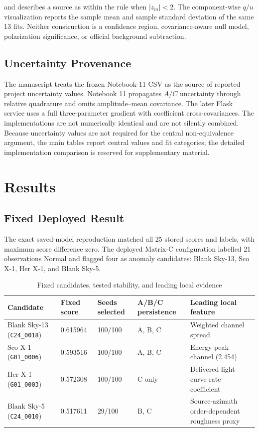 \documentclass[conference]{IEEEtran}
\begin{document}
and describes a source as within the rule when $|z_m|<2$. The component-wise $q/u$ visualization reports the sample mean and sample standard deviation of the same 13 fits. Neither construction is a confidence region, covariance-aware null model, polarization significance, or official background subtraction.


\subsection{Uncertainty Provenance}

The manuscript treats the frozen Notebook-11 CSV as the source of reported project uncertainty values. Notebook 11 propagates $A/C$ uncertainty through relative quadrature and omits amplitude--mean covariance. The later Flask service uses a full three-parameter gradient with coefficient cross-covariances. The implementations are not numerically identical and are not silently combined. Because uncertainty values are not required for the central non-equivalence argument, the main tables report central values and fit categories; the detailed implementation comparison is reserved for supplementary material.


\section{Results}

\subsection{Fixed Deployed Result}

The exact saved-model reproduction matched all 25 stored scores and labels, with maximum score difference zero. The deployed Matrix-C configuration labelled 21 observations Normal and flagged four as anomaly candidates: Blank Sky-13, Sco X-1, Her X-1, and Blank Sky-5.


\begin{table}[t]
\centering
\caption{Fixed candidates, tested stability, and leading local evidence}
\label{tab:3}
\footnotesize
\begin{tabular}{p{}p{}p{}p{}p{}}
\toprule
Candidate & Fixed score & Seeds selected & A/B/C persistence & Leading local feature \\
\midrule
Blank Sky-13 (\texttt{C24\_0018}) & 0.615964 & 100/100 & A, B, C & Weighted channel spread \\
Sco X-1 (\texttt{G01\_0006}) & 0.593516 & 100/100 & A, B, C & Energy peak channel (2.454) \\
Her X-1 (\texttt{G01\_0003}) & 0.572308 & 100/100 & C only & Delivered-light-curve rate coefficient \\
Blank Sky-5 (\texttt{C24\_0010}) & 0.517611 & 29/100 & B, C & Source-azimuth order-dependent roughness proxy \\
\bottomrule
\end{tabular}
\end{table}
\end{document}
